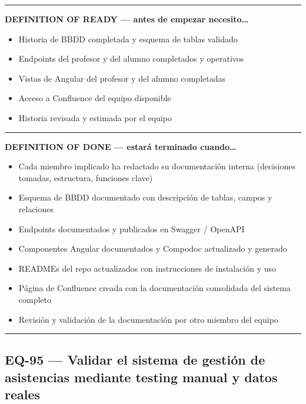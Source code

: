 \documentclass[
  spanish,
  11pt,
]{report}
\providecommand{\tightlist}{%
  \setlength{\itemsep}{0pt}\setlength{\parskip}{0pt}}
\begin{document}
\begin{center}\rule{0.5\linewidth}{0.5pt}\end{center}

\textbf{DEFINITION OF READY --- antes de empezar necesito\ldots{}}

\begin{itemize}
\tightlist
\item
  Historia de BBDD completada y esquema de tablas validado
\item
  Endpoints del profesor y del alumno completados y operativos
\item
  Vistas de Angular del profesor y del alumno completadas
\item
  Acceso a Confluence del equipo disponible
\item
  Historia revisada y estimada por el equipo
\end{itemize}

\begin{center}\rule{0.5\linewidth}{0.5pt}\end{center}

\textbf{DEFINITION OF DONE --- estará terminado cuando\ldots{}}

\begin{itemize}
\tightlist
\item
  Cada miembro implicado ha redactado su documentación interna
  (decisiones tomadas, estructura, funciones clave)
\item
  Esquema de BBDD documentado con descripción de tablas, campos y
  relaciones
\item
  Endpoints documentados y publicados en Swagger / OpenAPI
\item
  Componentes Angular documentados y Compodoc actualizado y generado
\item
  READMEs del repo actualizados con instrucciones de instalación y uso
\item
  Página de Confluence creada con la documentación consolidada del
  sistema completo
\item
  Revisión y validación de la documentación por otro miembro del equipo
\end{itemize}

\begin{center}\rule{0.5\linewidth}{0.5pt}\end{center}

\subsection{EQ-95 --- Validar el sistema de gestión de asistencias
mediante testing manual y datos
reales}\label{eq-95-validar-el-sistema-de-gestiuxf3n-de-asistencias-mediante-testing-manual-y-datos-reales}
\end{document}
